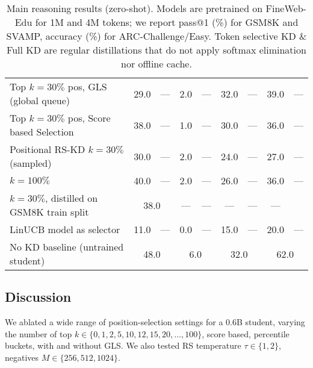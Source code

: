 \documentclass[11pt]{article}
\begin{document}
\begin{table*}[t]
\begin{tabular}{lcccccccc}
		\quad Top $k=30\%$ pos, GLS (global queue)          & 29.0                                               & ---                     & 2.0                      & ---                      & 32.0 & ---  & 39.0 & ---  \\
		\quad Top $k=30\%$ pos, Score based Selection       & 38.0                                               & ---                     & 1.0                      & ---                      & 30.0 & ---  & 36.0 & ---  \\
		\quad Positional RS-KD $k=30\%$	(sampled)           & 30.0                                               & ---                     & 2.0                      & ---                      & 24.0 & ---  & 27.0 & ---  \\
		\quad $k=100\%$                                     & 40.0                                               & ---                     & 2.0                      & ---                      & 26.0 & ---  & 36.0 & ---  \\
		\quad $k=30\%$, distilled on GSM8K train split      & \multicolumn{2}{c}{38.0}                           & ---                     & ---                      & ---                      & ---  & ---                \\
		\quad LinUCB model as selector                      & 11.0                                               & ---                     & 0.0                      & ---                      & 15.0 & ---  & 20.0 & ---  \\
		\midrule
		No KD baseline (untrained student)                  & \multicolumn{2}{c}{48.0}                           & \multicolumn{2}{c}{6.0} & \multicolumn{2}{c}{32.0} & \multicolumn{2}{c}{62.0}                             \\
		\bottomrule
	\end{tabular}
	\caption{Main reasoning results (zero-shot). Models are pretrained on FineWeb-Edu for 1M and 4M tokens; we report pass@1 (\%) for GSM8K and SVAMP, accuracy (\%) for ARC-Challenge/Easy.
		Token selective KD \& Full KD are regular distillations that do not apply softmax elimination nor offline cache.
	}
	\label{tab:main-reasoning}
\end{table*}

\subsection{Discussion}
\label{sec:discussion}
We ablated a wide range of position-selection settings for a 0.6B student, varying the number of top $k \in \{0,1,2,5,10,12,15,20,\ldots,100\}$, score based, percentile buckets, with and without GLS.
We also tested RS temperature $\tau{\in}\{1,2\}$, negatives $M{\in}\{256,512,1024\}$.  
\end{document}
